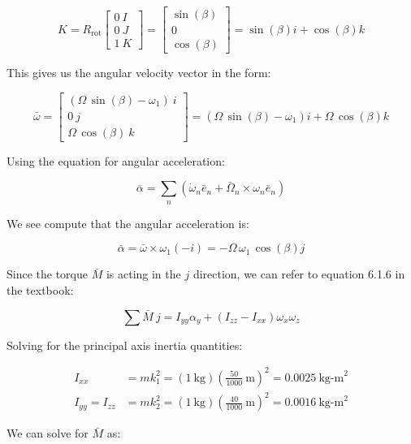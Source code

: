 \documentclass[12pt, letterpaper]{../assignment}
\begin{document}
$$ K = R_\text{rot}
\left[\begin{array}{ccc} 0 \ I \\ 0 \ J \\1 \ K \end{array}\right] = 
\left[\begin{array}{c} \sin\left(\beta \right)\\ 0\\ \cos\left(\beta \right) \end{array}\right]
= \sin\left(\beta \right) i + \cos\left(\beta \right) k$$

This gives us the angular velocity vector in the form:

$$ \bar{\omega} = \left[\begin{array}{r} \left(\Omega \,\sin\left(\beta \right)-\omega _{1}\right)\ i \\ 0\ j \\ \Omega \,\cos\left(\beta \right) \ k \end{array}\right]
= \left(\Omega \,\sin\left(\beta \right)-\omega _{1}\right) i + \Omega \,\cos\left(\beta \right)k $$

Using the equation for angular acceleration:

$$ \bar{\alpha} =
\sum_n \left( \dot{\omega}_n \bar{e}_n + \bar{\Omega}_n \times \omega_n \bar{e}_n \right) $$

We see compute that the angular acceleration is:

$$ \bar{\alpha} = \bar{\omega} \times \omega_1 (-i) = 
-\Omega \,\omega _{1}\,\cos\left(\beta \right) j $$

Since the torque $\bar{M}$ is acting in the $j$ direction,
we can refer to equation 6.1.6 in the textbook:

$$ \sum \bar{M} \ j =  I_{yy}\alpha_y +
    \left( I_{zz} - I_{xx} \right) \omega_x \omega_z $$

Solving for the principal axis inertia quantities:

\begin{equation*}
    \begin{aligned}
        I_{xx} &= m k_1^2 = (1\ \text{kg})\left(\frac{50}{1000} \ \text{m} \right)^2 = 0.0025\ \text{kg-m}^2\\
        I_{yy} = I_{zz} &= m k_2^2 = (1\ \text{kg})\left(\frac{40}{1000} \ \text{m} \right)^2 = 0.0016\ \text{kg-m}^2
    \end{aligned}
\end{equation*}

We can solve for $\bar{M}$ as:
\end{document}
